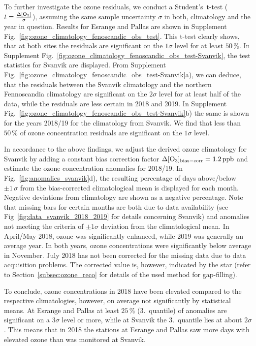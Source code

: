 \documentclass[bg, manuscript]{copernicus}
\begin{document}
To further investigate the ozone residuals, we conduct a Student's~t-test ($t = \frac{\chem{\Delta[O_3]}}{\sigma}$), assuming the same sample uncertainty $\sigma$ in both, climatology and the year in question. Results for Esrange and Pallas are shown in Supplement Fig.~\ref{fig:ozone_climatology_fenoscandic_obs_test}. This t-test clearly shows, that at both sites the residuals are significant on the $1\sigma$ level for at least $50\,\unit{\%}$. In Supplement Fig.~\ref{fig:ozone_climatology_fenoscandic_obs_test-Svanvik}, the test statistics for Svanvik are displayed. From Supplement Fig.~\ref{fig:ozone_climatology_fenoscandic_obs_test-Svanvik}a), we can deduce, that the residuals between the Svanvik climatology and the northern Fennoscandia climatology are significant on the $2\sigma$ level for at least half of the data, while the residuals are less certain in 2018 and 2019. In Supplement Fig.~\ref{fig:ozone_climatology_fenoscandic_obs_test-Svanvik}b) the same is shown for the years 2018/19 for the climatology from Svanvik. We find that less than $50\,\unit{\%}$ of ozone concentration residuals are significant on the $1\sigma$ level.

In accordance to the above findings, we adjust the derived ozone climatology for Svanvik by adding a constant bias correction factor $\Delta\chem{[O_3]_\mathrm{bias-corr}} = 1.2\,\unit{ppb}$ and estimate the ozone concentration anomalies for 2018/19. In Fig.~\ref{fig:anomalies_svanvik}d), the resulting percentage of days above/below $\pm 1\,\sigma$ from the bias-corrected climatological mean is displayed for each month. Negative deviations from climatology are shown as a negative percentage. Note that missing bars for certain months are both due to data availability (see Fig~\ref{fig:data_svanvik_2018_2019} for details concerning Svanvik) and anomalies not meeting the criteria of $\pm 1\sigma$ deviation from the climatological mean. In April/May 2018, ozone was significantly enhanced, while 2019 was generally an average year. In both years, ozone concentrations were significantly below average in November. July 2018 has not been corrected for the missing data due to data acquisition problems. The corrected value is, however, indicated by the star (refer to Section~\ref{subsec:ozone_reco} for details of the used method for gap-filling).

To conclude, ozone concentrations in 2018 have been elevated compared to the respective climatologies, however, on average not significantly by statistical means. At Esrange and Pallas at least $25\,\unit{\%}$ (3.~quantile) of anomalies are significant on a $3\sigma$ level or more, while at Svanvik the 3.~quantile lies at about $2\sigma$. This means that in 2018 the stations at Esrange and Pallas saw more days with elevated ozone than was monitored at Svanvik.
\end{document}
